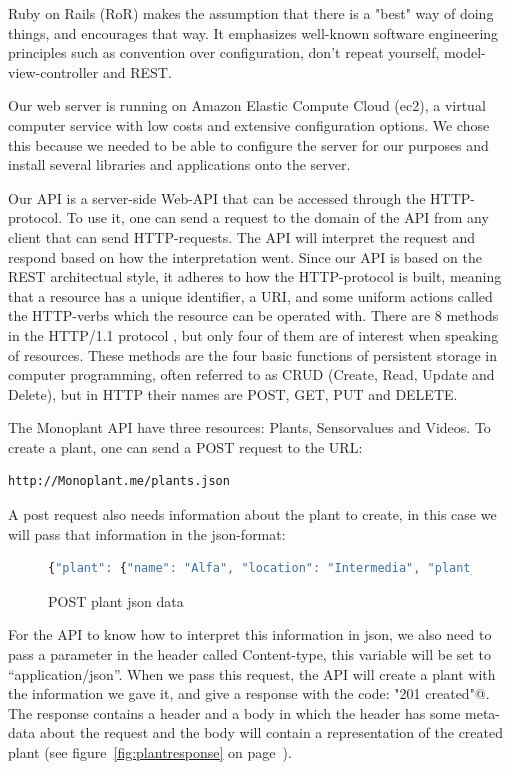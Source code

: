 Ruby on Rails (RoR) makes the assumption that there is a "best" way of doing things, and encourages that way. It emphasizes well-known software engineering principles such as convention over configuration, don't repeat yourself, model-view-controller and REST.

Our web server is running on Amazon Elastic Compute Cloud (ec2), a virtual computer service with low costs and extensive configuration options. We chose this because we needed to be able to configure the server for our purposes and install several libraries and applications onto the server. 

Our API is a server-side Web-API that can be accessed through the HTTP-protocol. To use it, one can send a request to the domain of the API from any client that can send HTTP-requests. The API will interpret the request and respond based on how the interpretation went. Since our API is based on the REST architectual style, it adheres to how the HTTP-protocol is built, meaning that a resource has a unique identifier, a URI, and some uniform actions called the HTTP-verbs which the resource can be operated with. There are 8 methods in the HTTP/1.1 protocol \citep[p.36]{fielding1999hypertext}, but only four of them are of interest when speaking of resources. These methods are the four basic functions of persistent storage in computer programming, often referred to as CRUD (Create, Read, Update and Delete), but in HTTP their names are POST, GET, PUT and DELETE. 

The Monoplant API have three resources: Plants, Sensorvalues and Videos. To create a plant, one can send a POST request to the URL: \begin{verbatim}http://Monoplant.me/plants.json\end{verbatim} A post request also needs information about the plant to create, in this case we will pass that information in the json-format:

\begin{figure}[H]
	\begin{lstlisting}[language=javascript]
	 {"plant": {"name": "Alfa", "location": "Intermedia", "plant_type": "Alfalfaspire"}} 
	\end{lstlisting}
	\caption{POST plant json data}
	\label{fig:postdata}
\end{figure}

For the API to know how to interpret this information in json, we also need to pass a parameter in the header called Content-type, this variable will be set to “application/json”. When we pass this request, the API will create a plant with the information we gave it, and give a response with the code: \verb@"201 created"@. The response contains a header and a body in which the header has some meta-data about the request and the body will contain a representation of the created plant (see figure~\ref{fig:plantresponse} on page~\pageref{fig:plantresponse}).

